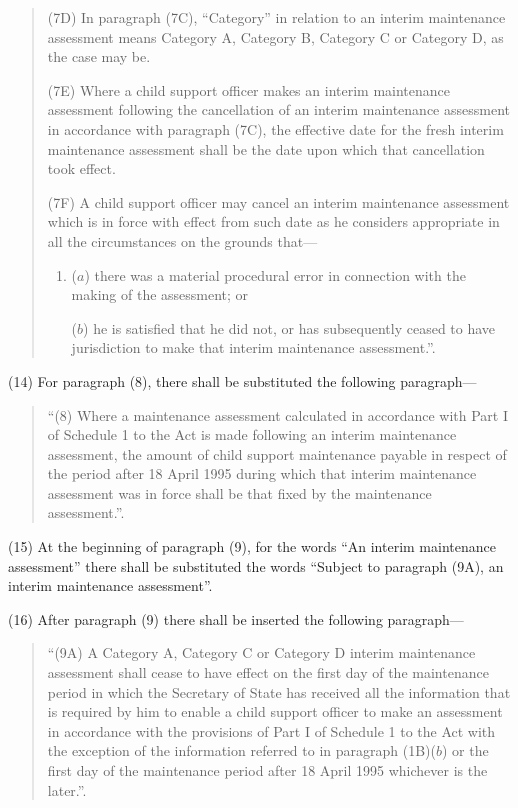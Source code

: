 \documentclass[12pt,a4paper]{article}
\begin{document}
\begin{quotation}
(7D) In paragraph (7C), “Category” in relation to an interim maintenance assessment means Category A, Category B, Category C or Category D, as the case may be.

(7E) Where a child support officer makes an interim maintenance assessment following the cancellation of an interim maintenance assessment in accordance with paragraph (7C), the effective date for the fresh interim maintenance assessment shall be the date upon which that cancellation took effect.

(7F) A child support officer may cancel an interim maintenance assessment which is in force with effect from such date as he considers appropriate in all the circumstances on the grounds that—
\begin{enumerate}\item[]
($a$) there was a material procedural error in connection with the making of the assessment; or

($b$) he is satisfied that he did not, or has subsequently ceased to have jurisdiction to make that interim maintenance assessment.”.
\end{enumerate}
\end{quotation}

(14) For paragraph (8), there shall be substituted the following paragraph—
\begin{quotation}
“(8) Where a maintenance assessment calculated in accordance with Part I of Schedule 1 to the Act is made following an interim maintenance assessment, the amount of child support maintenance payable in respect of the period after 18 April 1995 during which that interim maintenance assessment was in force shall be that fixed by the maintenance assessment.”.
\end{quotation}

(15) At the beginning of paragraph (9), for the words “An interim maintenance assessment” there shall be substituted the words “Subject to paragraph (9A), an interim maintenance assessment”.

(16) After paragraph (9) there shall be inserted the following paragraph—
\begin{quotation}
“(9A) A Category A, Category C or Category D interim maintenance assessment shall cease to have effect on the first day of the maintenance period in which the Secretary of State has received all the information that is required by him to enable a child support officer to make an assessment in accordance with the provisions of Part I of Schedule 1 to the Act with the exception of the information referred to in paragraph (1B)($b$) or the first day of the maintenance period after 18 April 1995 whichever is the later.”.
\end{quotation}
\end{document}
